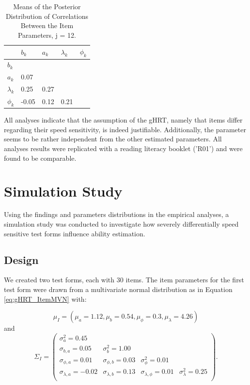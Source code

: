 \documentclass[a4paper,man,apacite,donotrepeattitle]{apa6}
\begin{document}
\begin{table}[ht]
\centering
\caption{Means of the Posterior Distribution of Correlations Between the Item Parameters, j = 12.} 
\begin{tabular}{lllll}
  \hline
 & $b_{k}$ & $a_{k}$ & $\lambda_{k}$ & $\phi_{k}$ \\ 
  \hline
$b_{k}$ &  &  &  &  \\ 
  $a_{k}$ & 0.07 &  &  &  \\ 
  $\lambda_{k}$ & 0.25 & 0.27 &  &  \\ 
  $\phi_{k}$ & -0.05 & 0.12 & 0.21 &  \\ 
   \hline
\end{tabular}
\label{tab:postCor}
\end{table}

All analyses indicate that the assumption of the gHRT, namely that items differ regarding their speed sensitivity, is indeed justifiable. Additionally, the parameter seems to be rather independent from the other estimated parameters. All analyses results were replicated with a reading literacy booklet ('R01') and were found to be comparable. 

\section{Simulation Study}
Using the findings and parameters distributions in the empirical analyses, a simulation study was conducted to investigate how severely differentially speed sensitive test forms influence ability estimation. 

\subsection{Design}
We created two test forms, each with 30 items. The item parameters for the first test form were drawn from a multivariate normal distribution as in Equation \ref{eq:gHRT_ItemMVN} with: 

\begin{equation}
	\mu_{I} = (\mu_{a} = 1.12, \mu_{b} = 0.54, \mu_{\phi} = 0.3, \mu_{\lambda} = 4.26)
\end{equation}
and
\begin{equation}
	\Sigma_I =	\begin{pmatrix}
\sigma^2_{a} = 0.45 &  &  &  \\
\sigma_{b, a} = 0.05 & \sigma^2_{b} = 1.00 &  &  \\
\sigma_{\phi, a} = 0.01 & \sigma_{\phi, b} = 0.03 & \sigma_{\phi}^2 = 0.01 &  \\
\sigma_{\lambda, a} = -0.02 & \sigma_{\lambda, b} = 0.13 & \sigma_{\lambda, \phi} = 0.01 & \sigma^2_{\lambda} = 0.25 \\
	\end{pmatrix}.	
\end{equation}
\end{document}
